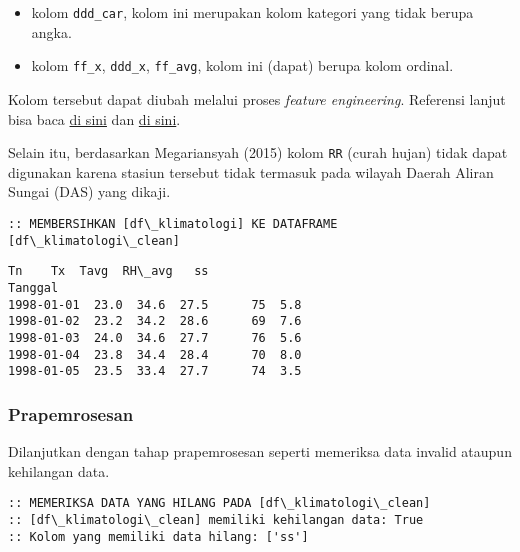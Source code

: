 \documentclass[11pt]{article}
\makeatletter
\providecommand{\tightlist}{%
      \setlength{\itemsep}{0pt}\setlength{\parskip}{0pt}}
\newcommand{\boxspacing}{\kern\kvtcb@left@rule\kern\kvtcb@boxsep}
\newcommand{\prompt}[4]{
        \ttfamily\llap{{\color{#2}[#3]:\hspace{3pt}#4}}\vspace{-\baselineskip}
    }
\makeatother
\begin{document}
\begin{itemize}
\tightlist
\item
  kolom \texttt{ddd\_car}, kolom ini merupakan kolom kategori yang tidak
  berupa angka.
\item
  kolom \texttt{ff\_x}, \texttt{ddd\_x}, \texttt{ff\_avg}, kolom ini
  (dapat) berupa kolom ordinal.
\end{itemize}

Kolom tersebut dapat diubah melalui proses \emph{feature engineering}.
Referensi lanjut bisa baca
\href{https://towardsdatascience.com/smarter-ways-to-encode-categorical-data-for-machine-learning-part-1-of-3-6dca2f71b159}{di
sini} dan
\href{https://towardsdatascience.com/basic-feature-engineering-to-reach-more-efficient-machine-learning-6294022e17a5}{di
sini}.

Selain itu, berdasarkan Megariansyah (2015) kolom \texttt{RR} (curah
hujan) tidak dapat digunakan karena stasiun tersebut tidak termasuk pada
wilayah Daerah Aliran Sungai (DAS) yang dikaji.

    \begin{Verbatim}[commandchars=\\\{\}]
:: MEMBERSIHKAN [df\_klimatologi] KE DATAFRAME [df\_klimatologi\_clean]
    \end{Verbatim}

            \begin{tcolorbox}[breakable, size=fbox, boxrule=.5pt, pad at break*=1mm, opacityfill=0]
\prompt{Out}{outcolor}{0}{\boxspacing}
\begin{Verbatim}[commandchars=\\\{\}]
              Tn    Tx  Tavg  RH\_avg   ss
Tanggal
1998-01-01  23.0  34.6  27.5      75  5.8
1998-01-02  23.2  34.2  28.6      69  7.6
1998-01-03  24.0  34.6  27.7      76  5.6
1998-01-04  23.8  34.4  28.4      70  8.0
1998-01-05  23.5  33.4  27.7      74  3.5
\end{Verbatim}
\end{tcolorbox}
        
    \hypertarget{prapemrosesan}{%
\subsubsection{Prapemrosesan}\label{prapemrosesan}}

Dilanjutkan dengan tahap prapemrosesan seperti memeriksa data invalid
ataupun kehilangan data.

    \begin{Verbatim}[commandchars=\\\{\}]
:: MEMERIKSA DATA YANG HILANG PADA [df\_klimatologi\_clean]
:: [df\_klimatologi\_clean] memiliki kehilangan data: True
:: Kolom yang memiliki data hilang: ['ss']
    \end{Verbatim}
\end{document}

